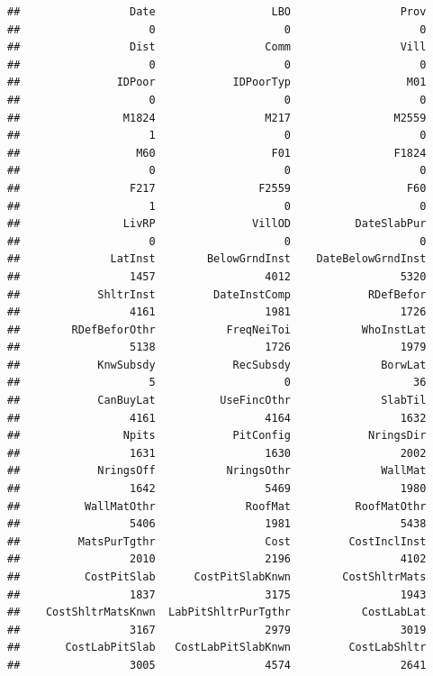 \documentclass[11pt,]{article}
\begin{document}
\begin{verbatim}
##                 Date                  LBO                 Prov 
##                    0                    0                    0 
##                 Dist                 Comm                 Vill 
##                    0                    0                    0 
##               IDPoor            IDPoorTyp                  M01 
##                    0                    0                    0 
##                M1824                 M217                M2559 
##                    1                    0                    0 
##                  M60                  F01                F1824 
##                    0                    0                    0 
##                 F217                F2559                  F60 
##                    1                    0                    0 
##                LivRP               VillOD          DateSlabPur 
##                    0                    0                    0 
##              LatInst        BelowGrndInst    DateBelowGrndInst 
##                 1457                 4012                 5320 
##            ShltrInst         DateInstComp            RDefBefor 
##                 4161                 1981                 1726 
##        RDefBeforOthr           FreqNeiToi           WhoInstLat 
##                 5138                 1726                 1979 
##            KnwSubsdy            RecSubsdy              BorwLat 
##                    5                    0                   36 
##            CanBuyLat          UseFincOthr              SlabTil 
##                 4161                 4164                 1632 
##                Npits            PitConfig            NringsDir 
##                 1631                 1630                 2002 
##            NringsOff           NringsOthr              WallMat 
##                 1642                 5469                 1980 
##          WallMatOthr              RoofMat          RoofMatOthr 
##                 5406                 1981                 5438 
##         MatsPurTgthr                 Cost         CostInclInst 
##                 2010                 2196                 4102 
##          CostPitSlab      CostPitSlabKnwn        CostShltrMats 
##                 1837                 3175                 1943 
##    CostShltrMatsKnwn  LabPitShltrPurTgthr           CostLabLat 
##                 3167                 2979                 3019 
##       CostLabPitSlab   CostLabPitSlabKnwn         CostLabShltr 
##                 3005                 4574                 2641 

\end{verbatim}
\end{document}
